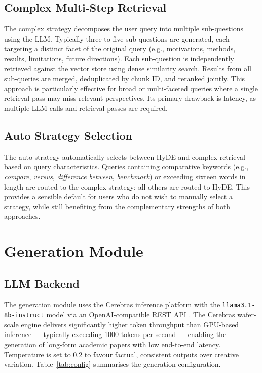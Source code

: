 \documentclass[12pt, a4paper]{article}
\begin{document}
\subsection{Complex Multi-Step Retrieval}

The complex strategy decomposes the user query into multiple sub-questions using
the LLM. Typically three to five sub-questions are generated, each targeting a
distinct facet of the original query (e.g., motivations, methods, results,
limitations, future directions). Each sub-question is independently retrieved
against the vector store using dense similarity search. Results from all
sub-queries are merged, deduplicated by chunk ID, and reranked jointly. This
approach is particularly effective for broad or multi-faceted queries where a
single retrieval pass may miss relevant perspectives. Its primary drawback is
latency, as multiple LLM calls and retrieval passes are required.

\subsection{Auto Strategy Selection}

The auto strategy automatically selects between HyDE and complex retrieval based
on query characteristics. Queries containing comparative keywords (e.g.,
\textit{compare}, \textit{versus}, \textit{difference between}, \textit{benchmark})
or exceeding sixteen words in length are routed to the complex strategy; all others
are routed to HyDE. This provides a sensible default for users who do not wish to
manually select a strategy, while still benefiting from the complementary strengths
of both approaches.

\section{Generation Module}

\subsection{LLM Backend}

The generation module uses the Cerebras inference platform with the
\texttt{llama3.1-8b-instruct} model via an OpenAI-compatible REST API
\cite{brown2020}. The Cerebras wafer-scale engine delivers significantly higher
token throughput than GPU-based inference --- typically exceeding 1000 tokens per
second --- enabling the generation of long-form academic papers with low end-to-end
latency. Temperature is set to 0.2 to favour factual, consistent outputs over
creative variation. Table~\ref{tab:config} summarises the generation configuration.
\end{document}
